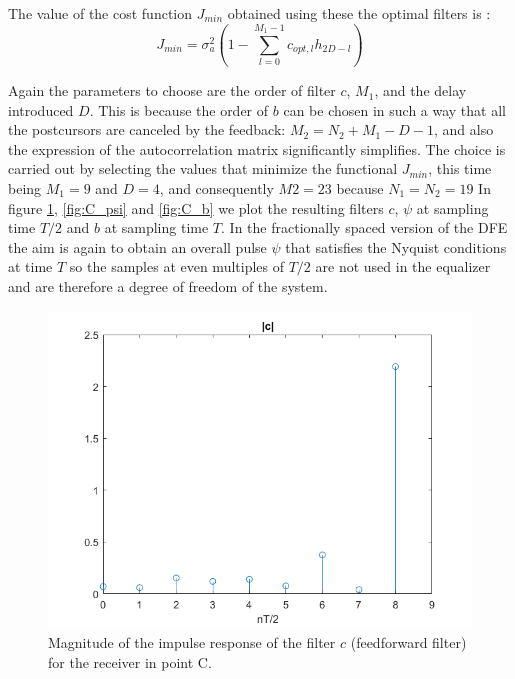 \documentclass[a4paper,11.5pt]{article}
\begin{document}
The value of the cost function $J_{min}$ obtained using these the optimal filters is :
\begin{equation} \label{eq:C_jmin}
J_{min} = \sigma^2_a \left( 1-\sum_{l=0}^{M_1-1} c_{opt,l}h_{2D-l}\right)
\end{equation}

Again the parameters to choose are the order of filter $c$, $M_1$, and the delay introduced $D$. This is because the order of $b$ can be chosen in such a way that all the postcursors are canceled by the feedback: $M_2=N_2+M_1-D-1$, and also the expression of the autocorrelation matrix significantly simplifies. The choice is carried out by selecting the values that minimize the functional $J_{min}$, this time being $M_1=9$ and $D=4$, and consequently $M2=23$ because $N_1=N_2=19$  In figure \ref{fig:C_c}, \ref{fig:C_psi} and \ref{fig:C_b} we plot the resulting filters $c$, $\psi$ at sampling time $T/2$ and $b$ at sampling time $T$. In the fractionally spaced version of the DFE the aim is again to obtain an overall pulse $\psi$ that satisfies the Nyquist conditions at time $T$ so the samples at even multiples of $T/2$ are not used in the equalizer and are therefore a degree of freedom of the system.

\begin{figure}[H]
	\begin{center}   
		\includegraphics[width=\textwidth]{figs/C_c.png} 
		\caption{Magnitude of the impulse response of the filter $c$ (feedforward filter) for the receiver in point C.}
		\label{fig:C_c}
	\end{center}
\end{figure}
\end{document}
